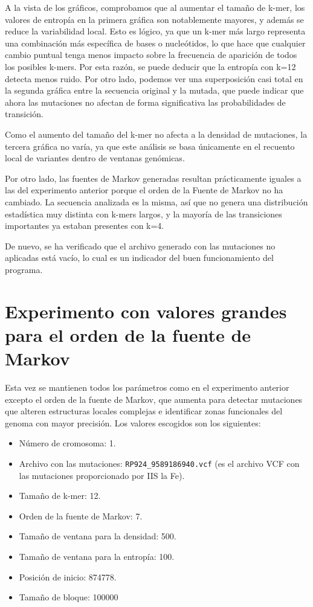 \documentclass[11pt,spanish,listoffigures,listoftables]{tfgetsinf}
\begin{document}
A la vista de los gráficos, comprobamos que al aumentar el tamaño de k-mer, los valores de entropía en la primera gráfica son notablemente mayores, y además se reduce la variabilidad local. Esto es lógico, ya que un k-mer más largo representa una combinación más específica de bases o nucleótidos, lo que hace que cualquier cambio puntual tenga menos impacto sobre la frecuencia de aparición de todos los posibles k-mers. Por esta razón, se puede deducir que la entropía con k=12 detecta menos ruido. Por otro lado, podemos ver una superposición casi total en la segunda gráfica entre la secuencia original y la mutada, que puede indicar que ahora las mutaciones no afectan de forma significativa las probabilidades de transición. 

Como el aumento del tamaño del k-mer no afecta a la densidad de mutaciones, la tercera gráfica no varía, ya que este análisis se basa únicamente en el recuento local de variantes dentro de ventanas genómicas. 

Por otro lado, las fuentes de Markov generadas resultan prácticamente iguales a las del experimento anterior porque el orden de la Fuente de Markov no ha cambiado. La secuencia analizada es la misma, así que no genera una distribución estadística muy distinta con k-mers largos, y la mayoría de las transiciones importantes ya estaban presentes con k=4.

De nuevo, se ha verificado que el archivo generado con las mutaciones no aplicadas está vacío, lo cual es un indicador del buen funcionamiento del programa.


\section{Experimento con valores grandes para el orden de la fuente de Markov}

Esta vez se mantienen todos los parámetros como en el experimento anterior excepto el orden de la fuente de Markov, que aumenta para detectar mutaciones que alteren estructuras locales complejas e identificar zonas funcionales del genoma con mayor precisión. Los valores escogidos son los siguientes:

\begin{itemize}
   \item Número de cromosoma: 1.
   \item Archivo con las mutaciones: \texttt{RP924\_9589186940.vcf}  (es el archivo \acs{VCF} con las mutaciones proporcionado por \acs{IIS} la Fe).
   \item Tamaño de k-mer: 12.
   \item Orden de la fuente de Markov: 7.
   \item Tamaño de ventana para la densidad: 500.
   \item Tamaño de ventana para la entropía: 100.
   \item Posición de inicio: 874778.
   \item Tamaño de bloque: 100000 
\end{itemize}
\end{document}
